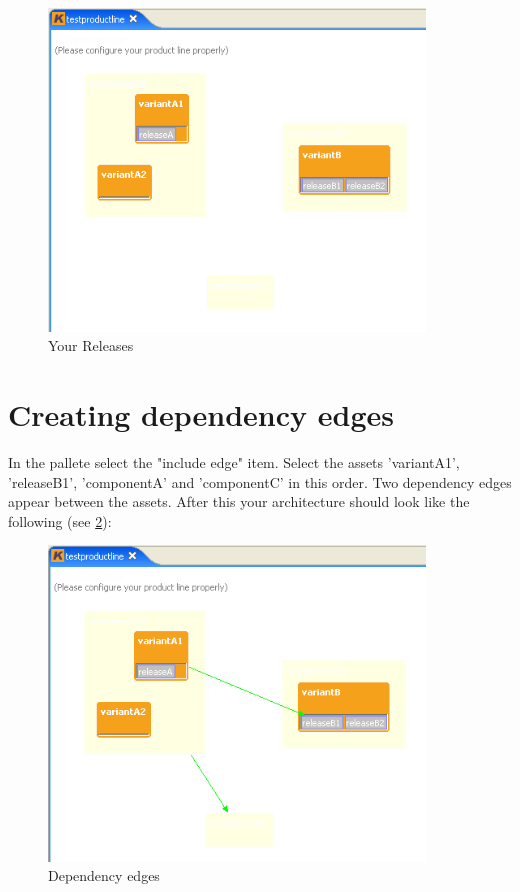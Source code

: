 \begin{figure}[h!]
\begin{center}
\includegraphics[width=10cm]{tutorial12.png}
   \caption{Your Releases}
   \label{release2}
\end{center}
\end{figure}\par



\section{Creating dependency edges}

In the pallete select the "include edge" item. Select the assets 'variantA1', 'releaseB1', 
'componentA' and 'componentC' in this order. Two dependency edges appear between the
assets. After this your architecture should look like the following (see \ref{edge}):

\begin{figure}[h!]
\begin{center}
\includegraphics[width=10cm]{tutorial13.png}
   \caption{Dependency edges}
   \label{edge}
\end{center}
\end{figure}\par



